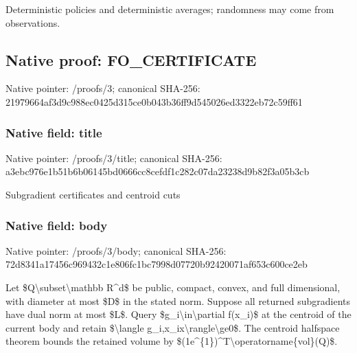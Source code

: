 \documentclass[10pt,a4paper]{article}
\begin{document}
Deterministic policies and deterministic averages; randomness may come from observations.


\subsection{Native proof: FO\_CERTIFICATE}


Native pointer: /proofs/3; canonical SHA-256: 21979664af3d9c988ec0425d\allowbreak{}315ce0b043b36ff9d545026e\allowbreak{}d3322eb72c59ff61



\subsubsection{Native field: title}


Native pointer: /proofs/3/title; canonical SHA-256: a3ebc976e1b51b6b06145bd0\allowbreak{}666cc8cefdf1c282c07da232\allowbreak{}38d9b82f3a05b3cb


Subgradient certificates and centroid cuts


\subsubsection{Native field: body}


Native pointer: /proofs/3/body; canonical SHA-256: 72d8341a17456c969432c1e8\allowbreak{}06fc1bc7998d07720b924200\allowbreak{}71af653c600ce2eb


Let \$Q\textbackslash{}subset\textbackslash{}mathbb R\textasciicircum{}d\$ be public, compact, convex, and full dimensional, with diameter at most \$D\$ in the stated norm. Suppose all returned subgradients have dual norm at most \$L\$. Query \$g\_i\textbackslash{}in\textbackslash{}partial f(x\_i)\$ at the centroid of the current body and retain \$\textbackslash{}langle g\_i,x\_ix\textbackslash{}rangle\textbackslash{}ge0\$. The centroid halfspace theorem bounds the retained volume by \$(1e\textasciicircum{}\{1\})\textasciicircum{}T\textbackslash{}operatorname\{vol\}(Q)\$.
\end{document}
